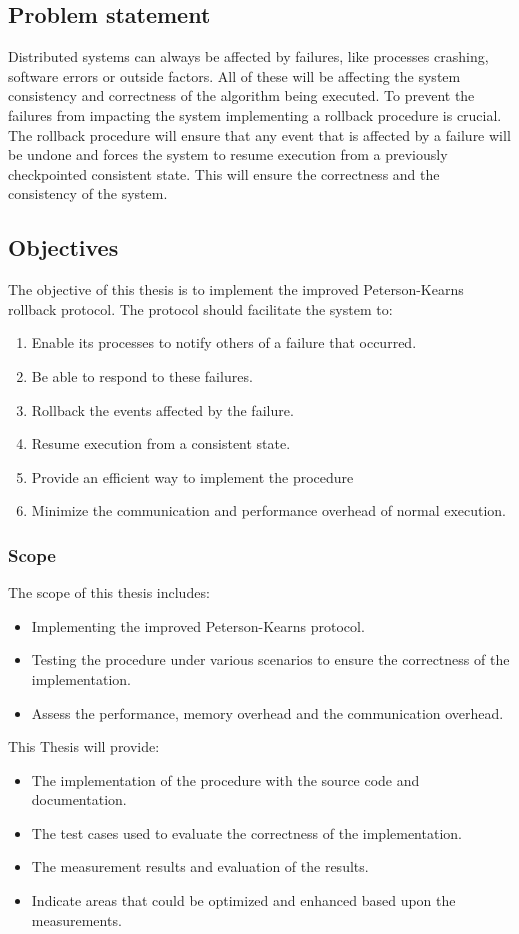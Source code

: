 \documentclass[twocolumn, a4paper,11pt]{article}%
\begin{document}
\subsection{Problem statement}
Distributed systems can always be affected by failures, like processes crashing, software errors or outside factors. All of these will be affecting the system consistency and correctness of the algorithm being executed. To prevent the failures from impacting the system implementing a rollback procedure is crucial. The rollback procedure will ensure that any event that is affected by a failure will be undone and forces the system to resume execution from a previously checkpointed consistent state. This will ensure the correctness and the consistency of the system.

\subsection{{Objectives}}
The objective of this thesis is to implement the improved Peterson-Kearns rollback protocol. The protocol should facilitate the system to:
\begin{enumerate}
	\item Enable its processes to notify others of a failure that occurred.
	\item Be able to respond to these failures.
	\item Rollback the events affected by the failure.
	\item Resume execution from a consistent state.
	\item Provide an efficient way to implement the procedure
	\item Minimize the communication  and performance overhead of normal execution.
\end{enumerate}

\subsubsection{Scope}
The scope of this thesis includes:
\begin{itemize}
	\item Implementing the improved Peterson-Kearns protocol.
	\item Testing the procedure under various scenarios to ensure the correctness of the implementation.
	\item Assess the performance, memory overhead and the communication overhead.
\end{itemize}
This Thesis will provide:
\begin{itemize}
	\item The implementation of the procedure with the source code and documentation.
	\item The test cases used to evaluate the correctness of the implementation.
	\item The measurement results and evaluation of the results.
	\item Indicate areas that could be optimized and enhanced based upon the measurements.
\end{itemize}
\end{document}
